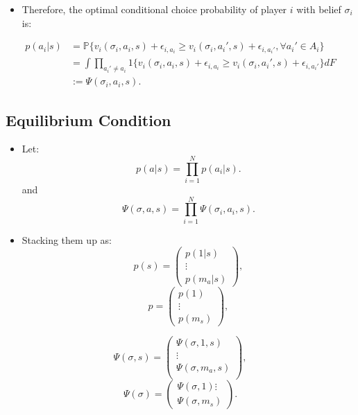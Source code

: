 \documentclass[
]{book}
\providecommand{\tightlist}{%
  \setlength{\itemsep}{0pt}\setlength{\parskip}{0pt}}
\begin{document}
\begin{itemize}
\tightlist
\item
  Therefore, the optimal conditional choice probability of player \(i\) with belief \(\sigma_i\) is:
\end{itemize}

\begin{equation}
\begin{split}
p(a_i|s) &= \mathbb{P}\{v_i(\sigma_i, a_i, s) + \epsilon_{i, a_i} \ge  v_i(\sigma_i, a_i', s) + \epsilon_{i, a_i'}, \forall a_i' \in A_i\}\\
&=\int \prod_{a_i' \neq a_i}1\{v_i(\sigma_i, a_i, s) + \epsilon_{i, a_i} \ge  v_i(\sigma_i, a_i', s) + \epsilon_{i, a_i'}\} d F\\
&:= \Psi(\sigma_i, a_i, s).
\end{split}
\end{equation}

\hypertarget{equilibrium-condition-1}{%
\subsection{Equilibrium Condition}\label{equilibrium-condition-1}}

\begin{itemize}
\tightlist
\item
  Let:
  \[
  p(a|s) = \prod_{i = 1}^N p(a_i|s).
  \]
  and
  \[
  \Psi(\sigma, a, s) = \prod_{i = 1}^N \Psi(\sigma_i, a_i, s).
  \]
\item
  Stacking them up as:
  \[
  p(s) = 
  \begin{pmatrix}
  p(1|s) \\
  \vdots \\
  p(m_a|s)
  \end{pmatrix},
  \]
  \[
  p = 
  \begin{pmatrix}
  p(1)\\
  \vdots\\
  p(m_s)
  \end{pmatrix},
  \]
\end{itemize}

\[
\Psi(\sigma, s) = 
\begin{pmatrix}
\Psi(\sigma, 1, s) \\
\vdots \\
\Psi(\sigma, m_a, s) \\
\end{pmatrix},
\]
\[
\Psi(\sigma) = 
\begin{pmatrix}
\Psi(\sigma, 1)
\vdots\\
\Psi(\sigma, m_s)
\end{pmatrix}.
\]
\end{document}

